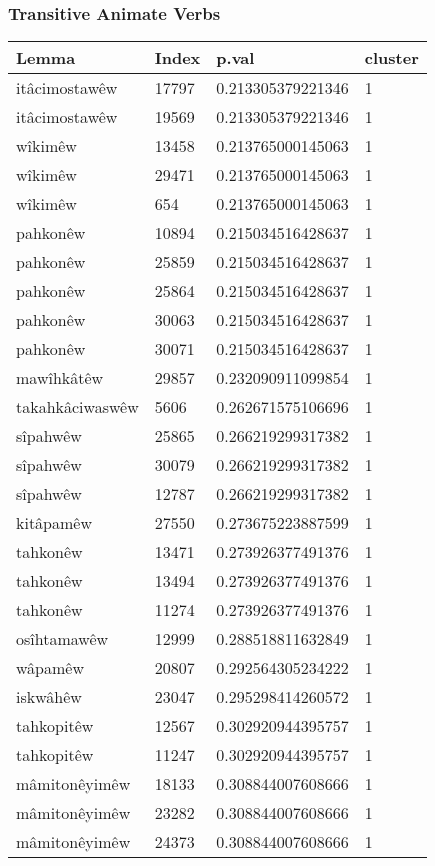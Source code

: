 \subsubsection{Transitive Animate Verbs}
\begin{longtable}{llll}
\toprule
Lemma & Index & p.val & cluster \\
\midrule
itâcimostawêw & 17797 & 0.213305379221346 & 1\\
itâcimostawêw & 19569 & 0.213305379221346 & 1\\
wîkimêw & 13458 & 0.213765000145063 & 1\\
wîkimêw & 29471 & 0.213765000145063 & 1\\
wîkimêw & 654 & 0.213765000145063 & 1\\
pahkonêw & 10894 & 0.215034516428637 & 1\\
pahkonêw & 25859 & 0.215034516428637 & 1\\
pahkonêw & 25864 & 0.215034516428637 & 1\\
pahkonêw & 30063 & 0.215034516428637 & 1\\
pahkonêw & 30071 & 0.215034516428637 & 1\\
mawîhkâtêw & 29857 & 0.232090911099854 & 1\\
takahkâciwaswêw & 5606 & 0.262671575106696 & 1\\
sîpahwêw & 25865 & 0.266219299317382 & 1\\
sîpahwêw & 30079 & 0.266219299317382 & 1\\
sîpahwêw & 12787 & 0.266219299317382 & 1\\
kitâpamêw & 27550 & 0.273675223887599 & 1\\
tahkonêw & 13471 & 0.273926377491376 & 1\\
tahkonêw & 13494 & 0.273926377491376 & 1\\
tahkonêw & 11274 & 0.273926377491376 & 1\\
osîhtamawêw & 12999 & 0.288518811632849 & 1\\
wâpamêw & 20807 & 0.292564305234222 & 1\\
iskwâhêw & 23047 & 0.295298414260572 & 1\\
tahkopitêw & 12567 & 0.302920944395757 & 1\\
tahkopitêw & 11247 & 0.302920944395757 & 1\\
mâmitonêyimêw & 18133 & 0.308844007608666 & 1\\
mâmitonêyimêw & 23282 & 0.308844007608666 & 1\\
mâmitonêyimêw & 24373 & 0.308844007608666 & 1\\

\end{longtable}
